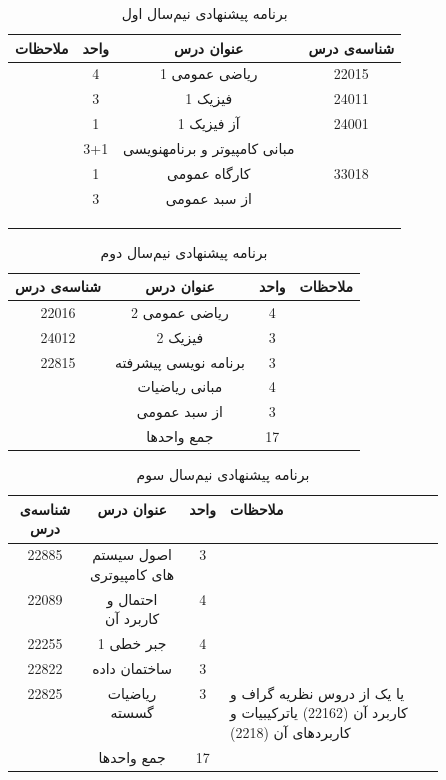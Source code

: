 \documentclass{article}
\begin{document}
\begin{table}[H]
\begin{center}
\begin{tabular}{|c|c|c|c|}
	\hline
	ملاحظات & واحد & عنوان درس & شناسه‌ی درس \\
	\hline
	& 4 & ریاضی عمومی 1 & 22015 \\
	\hline
	& 3 & فیزیک 1 & 24011 \\
	\hline
	& 1 & آز فیزیک 1 & 24001 \\
	\hline
	& 3+1 & مبانی کامپیوتر و برنامهنویسی &  \\
	\hline
	& 1 & کارگاه عمومی & 33018 \\
	\hline
	& 3 & از سبد عمومی &  \\
	\hline
	&  &  &  \\
	\hline
		&  &  &  \\
	\hline
	\multicolumn{4}{|c|}{} \\
	\hline
\end{tabular}
\caption{\label{cs-t6}
برنامه پیشنهادی نیم‌سال اول
}
\end{center}
\end{table}

\begin{table}[H]
\begin{center}
	\begin{tabular}{|c|c|c|c|}
		\hline
		شناسه‌ی درس & عنوان درس & واحد & ملاحظات \\
		\hline
		22016 & ریاضی عمومی 2 & 4 &  \\
		\hline
		24012 & فیزیک 2 & 3 &  \\
		\hline
		22815 & برنامه نویسی پیشرفته & 3 &  \\
		\hline
		& مبانی ریاضیات & 4 &  \\
		\hline
		& از سبد عمومی & 3 &  \\
		\hline
		& جمع واحدها & 17 &  \\
		\hline
	\end{tabular}
\caption{\label{cs-t7}
برنامه پیشنهادی نیم‌سال دوم
}
	\end{center}
	\end{table}

\begin{table}[H]
\begin{center}
\begin{tabular}{|c|c|c|p{0.5\linewidth}|}
	\hline
	شناسه‌ی درس & عنوان درس & واحد & ملاحظات \\
	\hline
	22885 & اصول سیستم های کامپیوتری & 3 &  \\
	\hline
	22089 & احتمال و کاربرد آن & 4 &  \\
	\hline
	22255 & جبر خطی 1 & 4 &  \\
	\hline
	22822 & ساختمان داده & 3 &  \\
	\hline
	22825 & ریاضیات گسسته & 3 & 
	یا یک از دروس نظریه گراف و کاربرد آن (22162) یاترکیبیات و کاربردهای آن (2218)
 \\
	\hline
	& جمع واحدها & 17 &  \\
	\hline
\end{tabular}
\caption{\label{cs-t8}
برنامه پیشنهادی نیم‌سال سوم
}
\end{center}
\end{table}
\end{document}
